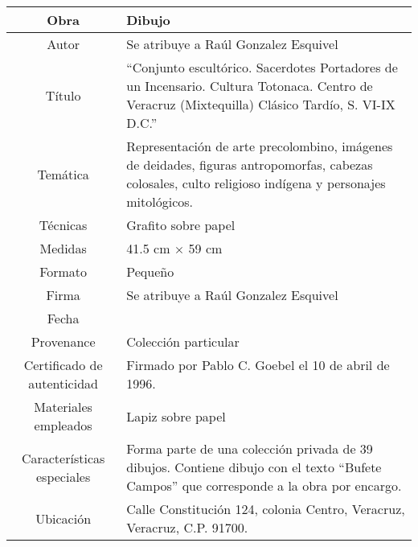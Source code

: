 \begin{table}[H]
\centering
\begin{tabular}{|c|m{}|}
\hline
Obra& Dibujo	\\
\hline
Autor & Se atribuye a Ra\'ul Gonzalez Esquivel\\
\hline
T\'itulo & ``Conjunto escult\'orico. Sacerdotes Portadores de un Incensario. Cultura Totonaca. Centro de Veracruz (Mixtequilla) Cl\'asico Tard\'io, S. VI-IX D.C.''\\
\hline
Tem\'atica & Representaci\'on de arte precolombino, im\'agenes de deidades, figuras antropomorfas, cabezas colosales, culto religioso ind\'igena y personajes mitol\'ogicos.\\
\hline
T\'ecnicas &Grafito sobre papel \\
\hline
Medidas & 41.5 cm $\times$ 59 cm \\
\hline
 Formato & Peque\~no \\
 \hline
 Firma & Se atribuye a Ra\'ul Gonzalez Esquivel\\ 
 \hline
  Fecha & \\
 \hline
 Provenance & Colecci\'on particular\\
 \hline
 Certificado de autenticidad& Firmado por Pablo C. Goebel el 10 de abril de 1996.  \\
 \hline 
  Materiales empleados & Lapiz sobre papel\\
 \hline
 Caracter\'isticas especiales & Forma parte de una colecci\'on privada de 39 dibujos. 
Contiene dibujo con el texto ``Bufete Campos'' que corresponde a la obra por encargo. \\
\hline 
Ubicaci\'on & Calle Constituci\'on 124, colonia Centro, Veracruz, Veracruz, C.P. 91700.\\
\hline

\end{tabular}
\end{table}

